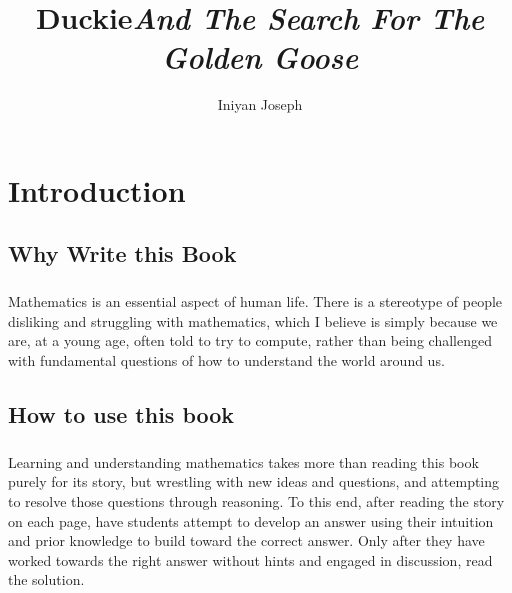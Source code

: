 \documentclass[a4paper,11pt ]{book}
\title{\textbf{Duckie}\linebreak \textit{And The Search For The Golden Goose}}
\author{Iniyan Joseph}
\begin{document}
\newcommand{\subchapter}[5]{
\begin{multicols*}{2}
\raggedcolumns
\section{#1}
\vfill
\paragraph*{} #2
\vfill
\paragraph*{} #3
\vfill
\paragraph*{Definition} #4
 \columnbreak
\begin{center}
\vspace*{\fill}
    #5
    \vspace*{\fill}
\end{center}
\end{multicols*}
\vfill
\pagebreak
}

\maketitle
\chapter*{Introduction}
\section*{Why Write this Book}
\paragraph*{} Mathematics is an essential aspect of human life. There is a stereotype of people disliking and struggling with mathematics, which I believe is simply because we are, at a young age, often told to try to compute, rather than being challenged with fundamental questions of how to understand the world around us. 
\section*{How to use this book}
\paragraph*{} Learning and understanding mathematics takes more than reading this book purely for its story, but wrestling with new ideas and questions, and attempting to resolve those questions through reasoning. To this end, after reading the story on each page, have students attempt to develop an answer using their intuition and prior knowledge to build toward the correct answer. Only after they have worked towards the right answer without hints and engaged in discussion, read the solution.
\end{document}
